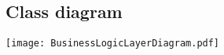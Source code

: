 \documentclass[../report.tex]{subfiles}
\begin{document}
\graphicspath{{img/}{../img/}}



\begin{landscape}


\subsection{Class diagram}

\texttt{[image: BusinessLogicLayerDiagram.pdf]}

\end{landscape}
\end{document}
